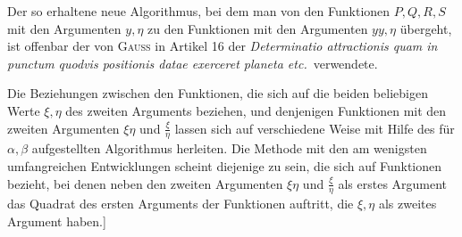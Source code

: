 Der so erhaltene neue Algorithmus, bei dem man von den Funktionen $P,\allowbreak Q,\allowbreak R,\allowbreak S$ mit den Argumenten $y,\allowbreak \eta$ zu den Funktionen mit den Argumenten $yy,\allowbreak \eta$ übergeht, ist offenbar der von \textsc{Gauss} in Artikel 16 der \textit{Determinatio attractionis quam in punctum quodvis positionis datae exerceret planeta etc.}\ verwendete.

Die Beziehungen zwischen den Funktionen, die sich auf die beiden beliebigen Werte $\xi,\allowbreak \eta$ des zweiten Arguments beziehen, und denjenigen Funktionen mit den zweiten Argumenten $\xi\eta$ und $\frac\xi\eta$ lassen sich auf verschiedene Weise mit
Hilfe des für $\alpha,\allowbreak \beta$ aufgestellten Algorithmus herleiten. Die Methode mit den am wenigsten umfangreichen Entwicklungen scheint diejenige zu sein, die sich auf Funktionen bezieht, bei denen neben den zweiten Argumenten $\xi\eta$ und $\frac{\xi}{\eta}$ als erstes Argument das Quadrat des ersten Arguments der Funktionen auftritt, die $\xi,\allowbreak \eta$ als zweites Argument haben.]

